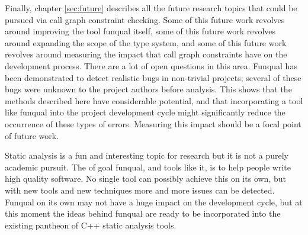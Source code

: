 Finally, chapter \ref{sec:future} describes all the future research topics that could be pursued via call graph constraint checking.  Some of this future work revolves around improving the tool funqual itself, some of this future work revolves around expanding the scope of the type system, and some of this future work revolves around measuring the impact that call graph constraints have on the development process.  There are a lot of open questions in this area.  Funqual has been demonstrated to detect realistic bugs in non-trivial projects; several of these bugs were unknown to the project authors before analysis.  This shows that the methods described here have considerable potential, and that incorporating a tool like funqual into the project development cycle might significantly reduce the occurrence of these types of errors.  Measuring this impact should be a focal point of future work.  

Static analysis is a fun and interesting topic for research but it is not a purely academic pursuit.  The of goal funqual, and tools like it, is to help people write high quality software.  No single tool can possibly achieve this on its own, but with new tools and new techniques more and more issues can be detected.  Funqual on its own may not have a huge impact on the development cycle, but at this moment the ideas behind funqual are ready to be incorporated into the existing pantheon of C++ static analysis tools.  


